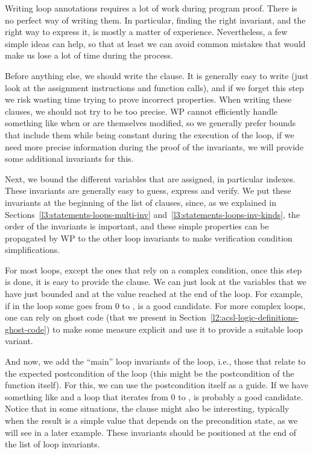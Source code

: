 

Writing loop annotations requires a lot of work during program proof. There is
no perfect way of writing them. In particular, finding the right invariant, and
the right way to express it, is mostly a matter of experience. Nevertheless, a
few simple ideas can help, so that at least we can avoid common mistakes that
would make us lose a lot of time during the process.


Before anything else, we should write the  clause. It is
generally easy to write (just look at the assignment instructions and function
calls), and if we forget this step we risk wasting time trying to prove incorrect
properties. When writing these clauses, we should not try to be too precise. WP cannot 
efficiently handle something like  when  or
 are themselves modified, so we generally prefer bounds that
include them while being constant during the execution of the loop, if we need
more precise information during the proof of the invariants, we will provide
some additional invariants for this.


Next, we bound the different variables that are assigned, in particular indexes.
These invariants are generally easy to guess, express and verify. We put these
invariants at the beginning of the list of  clauses,
since, as we explained in Sections~\ref{l3:statements-loops-multi-inv}
and~\ref{l3:statements-loops-inv-kinds}, the order of the invariants is important,
and these simple properties can be propagated by WP to the other loop invariants
to make verification condition simplifications.


For most loops, except the ones that rely on a complex condition, once this step
is done, it is easy to provide the  clause. We can just
look at the variables that we have just bounded and at the value reached
at the end of the loop. For example, if in the loop some 
goes from 0 to ,  is a good candidate. For more
complex loops, one can rely on ghost code (that we present in
Section~\ref{l2:acsl-logic-definitions-ghost-code}) to make some measure
explicit and use it to provide a suitable loop variant.


And now, we add the ``main'' loop invariants of the loop, i.e., those that relate to
the expected postcondition of the loop (this might be the postcondition of the
function itself). For this, we can use the postcondition itself as a guide. If
we have something like  and a loop that iterates
 from 0 to ,  is
probably a good candidate. Notice that in some situations, the
 clause might also be interesting, typically when the result
is a simple value that depends on the precondition state, as we will see in a
later example. These invariants should be positioned at the end of the list of
loop invariants.


